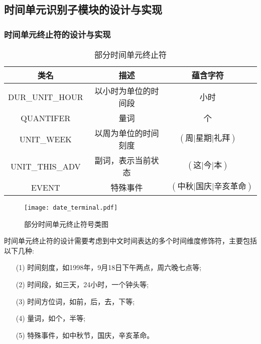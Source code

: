 \subsection{时间单元识别子模块的设计与实现}

\subsubsection{时间单元终止符的设计与实现}

\begin{table}[t]
    \centering
    \caption{部分时间单元终止符}
    \begin{tabular}{*{4}{c}}
        \toprule
        类名            & 描述                 & 蕴含字符                                 \\
        \midrule
        DUR\_UNIT\_HOUR & 以小时为单位的时间段 & 小时                                     \\
        QUANTIFER       & 量词                 & 个                                       \\
        UNIT\_WEEK      & 以周为单位的时间刻度 & $\left(\text{周|星期|礼拜}\right)$       \\
        UNIT\_THIS\_ADV & 副词，表示当前状态   & $\left(\text{这|今|本}\right)$           \\
        EVENT           & 特殊事件             & $\left(\text{中秋|国庆|辛亥革命}\right)$ \\
        \bottomrule
    \end{tabular}
    \label{tab:date_terminal}
\end{table}

\begin{figure}[h]
    \centering
    \texttt{[image: date\_terminal.pdf]}
    \caption{部分时间单元终止符号类图}
    \label{fig:date_terminal}
\end{figure}

时间单元终止符的设计需要考虑到中文时间表达的多个时间维度修饰符，主要包括以下几种:
\begin{enumerate}
    \item[(1)] 时间刻度，如1998年，9月18日下午两点，周六晚七点等;
    \item[(2)] 时间段，如三天，24小时，一个钟头等;
    \item[(3)] 时间方位词，如前，后，去，下等;
    \item[(4)] 量词，如个，半等;
    \item[(5)] 特殊事件，如中秋节，国庆，辛亥革命。
\end{enumerate}

